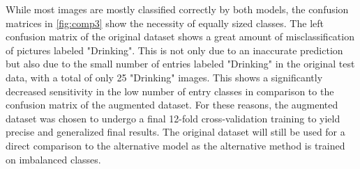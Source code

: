 \noindent
While most images are mostly classified correctly by both models, the confusion matrices in \autoref{fig:comp3} show the necessity of equally sized classes.
The left confusion matrix of the original dataset shows a great amount of misclassification of pictures labeled "Drinking". This is not only due to an inaccurate prediction but also due to the small number of entries labeled "Drinking" in the original test data, with a total of only 25 "Drinking" images. This shows a significantly decreased sensitivity in the low number of entry classes in comparison to the confusion matrix of the augmented dataset. For these reasons, the augmented dataset was chosen to undergo a final 12-fold cross-validation training to yield precise and generalized final results. The original dataset will still be used for a direct comparison to the alternative model as the alternative method is trained on imbalanced classes.
